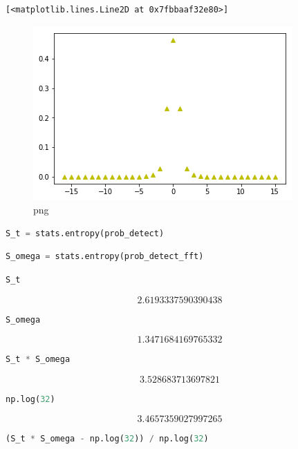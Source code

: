 \begin{lstlisting}
[<matplotlib.lines.Line2D at 0x7fbbaaf32e80>]
\end{lstlisting}

\begin{figure}
\centering
\includegraphics[width=0.66\linewidth]{output_95_1.png}
\caption{png}
\end{figure}

\begin{lstlisting}[language=Python]
S_t = stats.entropy(prob_detect)
\end{lstlisting}

\begin{lstlisting}[language=Python]
S_omega = stats.entropy(prob_detect_fft)
\end{lstlisting}

\begin{lstlisting}[language=Python]
S_t
\end{lstlisting}

\[2.6193337590390438\]

\begin{lstlisting}[language=Python]
S_omega
\end{lstlisting}

\[1.3471684169765332\]

\begin{lstlisting}[language=Python]
S_t * S_omega
\end{lstlisting}

\[3.528683713697821\]

\begin{lstlisting}[language=Python]
np.log(32)
\end{lstlisting}

\[3.4657359027997265\]

\begin{lstlisting}[language=Python]
(S_t * S_omega - np.log(32)) / np.log(32)
\end{lstlisting}

